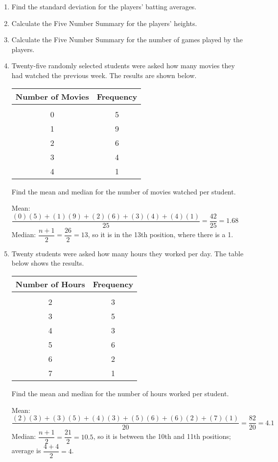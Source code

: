 \begin{enumerate}
\item Find the standard deviation for the players' batting averages. 

\item Calculate the Five Number Summary for the players' heights. 

\item Calculate the Five Number Summary for the number of games played by the players. 

\item Twenty-five randomly selected students were asked how many movies they had watched the previous week.  The results are shown below.
\begin{center}
\begin{tabular}{c c}
\textbf{Number of Movies} & \textbf{Frequency}\\
\hline
& \\
0 & 5\\
1 & 9\\
2 & 6\\
3 & 4\\
4 & 1
\end{tabular}
\end{center}
Find the mean and median for the number of movies watched per student. 
\begin{center}
Mean: $\dfrac{(0)(5) + (1)(9) + (2)(6) + (3)(4) + (4)(1)}{25} = \dfrac{42}{25} = 1.68$\\
Median: $\dfrac{n+1}{2} = \dfrac{26}{2} = 13$, so it is in the 13th position, where there is a 1.
\end{center}

\item Twenty students were asked how many hours they worked per day.  The table below shows the results.
\begin{center}
\begin{tabular}{c c}
\textbf{Number of Hours} & \textbf{Frequency}\\
\hline
& \\
2 & 3\\
3 & 5\\
4 & 3\\
5 & 6\\
6 & 2\\
7 & 1
\end{tabular}
\end{center}
Find the mean and median for the number of hours worked per student. 
\begin{center}
Mean: $\dfrac{(2)(3) + (3)(5) + (4)(3) + (5)(6) + (6)(2) + (7)(1)}{20} = \dfrac{82}{20} = 4.1$\\
Median: $\dfrac{n+1}{2} = \dfrac{21}{2} = 10.5$, so it is between the 10th and 11th positions; average is $\dfrac{4 + 4}{2} = 4$.
\end{center}


\end{enumerate}
